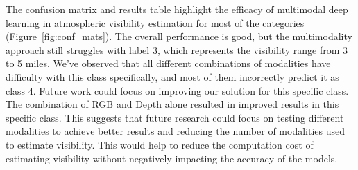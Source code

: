 


The confusion matrix and results table highlight the efficacy of multimodal deep learning in atmospheric visibility estimation for most of the categories (Figure~\ref{fig:conf_mats}). The overall performance is good, but the multimodality approach still struggles with label 3, which represents the visibility range from 3 to 5 miles. We've observed that all different combinations of modalities have difficulty with this class specifically, and most of them incorrectly predict it as class 4. Future work could focus on improving our solution for this specific class. The combination of RGB and Depth alone resulted in improved results in this specific class. This suggests that future research could focus on testing different modalities to achieve better results and reducing the number of modalities used to estimate visibility. This would help to reduce the computation cost of estimating visibility without negatively impacting the accuracy of the models.

